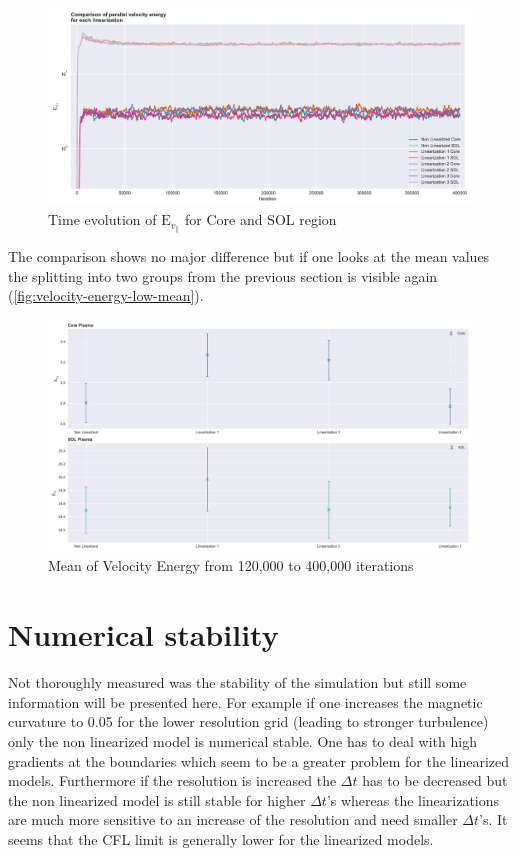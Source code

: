 \documentclass[master.tex]{subfiles}
\begin{document}
\begin{figure}[!htbp]
    \includegraphics[width=\linewidth]{pdfs/velocity-energy-low.pdf}
    \caption{Time evolution of $\mathrm{E}_{v_\parallel}$ for Core and \ac{SOL} region}
    \label{fig:velocity-energy-low}
\end{figure}

The comparison shows no major difference but if one looks at the mean values the splitting into two groups from the previous section is visible again (\autoref{fig:velocity-energy-low-mean}).


\begin{figure}[!htbp]
    \includegraphics[width=\linewidth]{pdfs/velocity-energy-low-means.pdf}
    \caption{Mean of Velocity Energy from 120,000 to 400,000 iterations}
    \label{fig:velocity-energy-low-mean}
\end{figure}

\section{Numerical stability}
Not thoroughly measured was the stability of the simulation but still some information will be presented here. For example if one increases the magnetic curvature to 0.05 for the lower resolution grid (leading to stronger turbulence) only the non linearized model is numerical stable. One has to deal with high gradients at the boundaries which seem to be a greater problem for the linearized models. 
Furthermore if the resolution is increased the $\Delta t$ has to be decreased but the non linearized model is still stable for higher $\Delta t$'s whereas the linearizations are much more sensitive to an increase of the resolution and need smaller $\Delta t$'s. It seems that the \ac{CFL} limit is generally lower for the linearized models.
\end{document}
